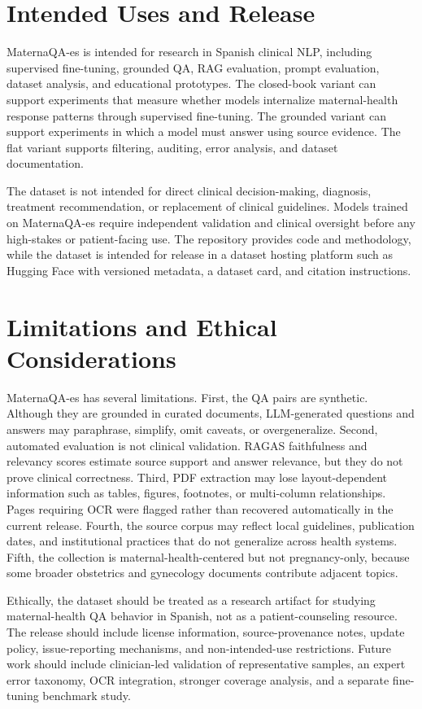 \documentclass[conference]{IEEEtran}
\begin{document}
\section{Intended Uses and Release}
MaternaQA-es is intended for research in Spanish clinical NLP, including supervised fine-tuning, grounded QA, RAG evaluation, prompt evaluation, dataset analysis, and educational prototypes. The closed-book variant can support experiments that measure whether models internalize maternal-health response patterns through supervised fine-tuning. The grounded variant can support experiments in which a model must answer using source evidence. The flat variant supports filtering, auditing, error analysis, and dataset documentation.

The dataset is not intended for direct clinical decision-making, diagnosis, treatment recommendation, or replacement of clinical guidelines. Models trained on MaternaQA-es require independent validation and clinical oversight before any high-stakes or patient-facing use. The repository provides code and methodology, while the dataset is intended for release in a dataset hosting platform such as Hugging Face with versioned metadata, a dataset card, and citation instructions.

\section{Limitations and Ethical Considerations}
MaternaQA-es has several limitations. First, the QA pairs are synthetic. Although they are grounded in curated documents, LLM-generated questions and answers may paraphrase, simplify, omit caveats, or overgeneralize. Second, automated evaluation is not clinical validation. RAGAS faithfulness and relevancy scores estimate source support and answer relevance, but they do not prove clinical correctness. Third, PDF extraction may lose layout-dependent information such as tables, figures, footnotes, or multi-column relationships. Pages requiring OCR were flagged rather than recovered automatically in the current release. Fourth, the source corpus may reflect local guidelines, publication dates, and institutional practices that do not generalize across health systems. Fifth, the collection is maternal-health-centered but not pregnancy-only, because some broader obstetrics and gynecology documents contribute adjacent topics.

Ethically, the dataset should be treated as a research artifact for studying maternal-health QA behavior in Spanish, not as a patient-counseling resource. The release should include license information, source-provenance notes, update policy, issue-reporting mechanisms, and non-intended-use restrictions. Future work should include clinician-led validation of representative samples, an expert error taxonomy, OCR integration, stronger coverage analysis, and a separate fine-tuning benchmark study.
\end{document}

